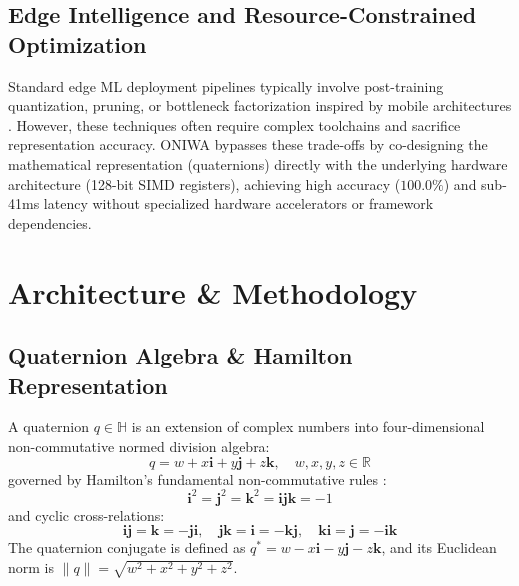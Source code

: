 \documentclass[10pt,twocolumn,letterpaper]{article}
\begin{document}
\subsection{Edge Intelligence and Resource-Constrained Optimization}
Standard edge ML deployment pipelines typically involve post-training quantization, pruning, or bottleneck factorization inspired by mobile architectures \cite{sandler2018mobilenetv2, lin2020mcunet}. However, these techniques often require complex toolchains and sacrifice representation accuracy. ONIWA bypasses these trade-offs by co-designing the mathematical representation (quaternions) directly with the underlying hardware architecture (128-bit SIMD registers), achieving high accuracy ($100.0\%$) and sub-41ms latency without specialized hardware accelerators or framework dependencies.



\section{Architecture \& Methodology}

\subsection{Quaternion Algebra \& Hamilton Representation}
A quaternion $q \in \mathbb{H}$ is an extension of complex numbers into four-dimensional non-commutative normed division algebra:
\begin{equation}
q = w + x\mathbf{i} + y\mathbf{j} + z\mathbf{k}, \quad w, x, y, z \in \mathbb{R}
\end{equation}
governed by Hamilton's fundamental non-commutative rules \cite{hamilton1843}:
\begin{equation}
\mathbf{i}^2 = \mathbf{j}^2 = \mathbf{k}^2 = \mathbf{i}\mathbf{j}\mathbf{k} = -1
\end{equation}
and cyclic cross-relations:
\begin{equation}
\mathbf{i}\mathbf{j} = \mathbf{k} = -\mathbf{j}\mathbf{i}, \quad \mathbf{j}\mathbf{k} = \mathbf{i} = -\mathbf{k}\mathbf{j}, \quad \mathbf{k}\mathbf{i} = \mathbf{j} = -\mathbf{i}\mathbf{k}
\end{equation}
The quaternion conjugate is defined as $q^* = w - x\mathbf{i} - y\mathbf{j} - z\mathbf{k}$, and its Euclidean norm is $\|q\| = \sqrt{w^2 + x^2 + y^2 + z^2}$.
\end{document}
